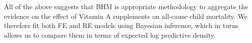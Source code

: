 \documentclass[12pt]{article}
\begin{document}
All of the above suggests that BHM is appropriate methodology to aggregate the evidence on the effect of Vitamin A supplements on all-cause child mortality. We therefore fit both FE and RE models using Bayesian inference, which in turns allows us to compare them in terms of expected log predictive density.






\end{document}
